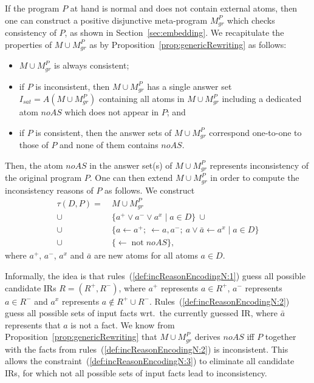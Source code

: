 \documentclass[11pt,fleqn,twoside]{article}
\def\naf{\ensuremath{\mathop{not}}}
\begin{document}
			If the program $P$ at hand is normal and does not contain external atoms, then one can construct a positive disjunctive meta-program $M^P_{\mathit{gr}}$ which
			checks consistency of $P$, as shown in Section~\ref{sec:embedding}.
			We recapitulate the properties of $M \cup M^P_{\mathit{gr}}$ as by Proposition~\ref{prop:genericRewriting} as follows:
			\begin{itemize}
				\item $M \cup M^P_{\mathit{gr}}$ is always consistent;
				\item if $P$ is inconsistent, then $M \cup M^P_{\mathit{gr}}$ has a single answer set $I_{\mathit{sat}} = A(M \cup M^P_{\mathit{gr}})$ containing all atoms in $M \cup M^P_{\mathit{gr}}$
					including a dedicated atom $\mathit{noAS}$ which does not appear in $P$; and
				\item if $P$ is consistent, then the answer sets of $M \cup M^P_{\mathit{gr}}$ correspond one-to-one to those of $P$ and none of them contains $\mathit{noAS}$. 
			\end{itemize}

			Then, the atom $\mathit{noAS}$ in the answer set(s) of $M \cup M^P_{\mathit{gr}}$ represents inconsistency of the original program $P$.
			One can then extend $M \cup M^P_{\mathit{gr}}$ in order to compute the inconsistency reasons of $P$ as follows.
			We construct
			\begin{align}
				\tau(D, P) = & \ M \cup M^P_{\mathit{gr}} \\
								\cup & \ \{ a^{+} \vee a^{-} \vee a^{x} \mid a \in D \} \ \cup \label{def:incReasonEncodingN:1} \\
								\cup & \ \{ a \leftarrow a^{+}; \ \leftarrow a, a^{-}; \ a \vee \bar{a} \leftarrow a^{x} \mid a \in D \} \label{def:incReasonEncodingN:2} \\
								\cup & \ \{ \leftarrow \naf \mathit{noAS} \}\text{,} \label{def:incReasonEncodingN:3}
			\end{align}
			where $a^{+}$, $a^{-}$, $a^{x}$ and $\bar{a}$ are new atoms for all atoms $a \in D$.

			Informally, the idea is that
			rules~(\ref{def:incReasonEncodingN:1}) guess all possible candidate IRs $R = (R^{+}, R^{-})$, where $a^{+}$ represents $a \in R^{+}$, $a^{-}$ represents $a \in R^{-}$
			and $a^{x}$ represents $a \not\in R^{+} \cup R^{-}$.
			Rules~(\ref{def:incReasonEncodingN:2}) guess all possible sets of input facts wrt.~the currently guessed IR,
			where $\bar{a}$ represents that $a$ is not a fact.
			We know from Proposition~\ref{prop:genericRewriting} that $M \cup M^P_{\mathit{gr}}$ derives $\mathit{noAS}$ iff $P$ together with the facts from rules~(\ref{def:incReasonEncodingN:2}) is inconsistent.
			This allows the constraint~(\ref{def:incReasonEncodingN:3}) to eliminate all candidate IRs,
			for which not all possible sets of input facts lead to inconsistency.
			
\end{document}
